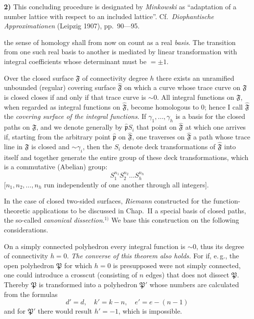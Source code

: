 \documentclass{article}
\begin{document}
\textbf{2)} This concluding procedure is designated by \emph{Minkowski} as ``adaptation of a number lattice with respect to an included lattice''. Cf.\ \emph{Diophantische Approximationen} (Leipzig 1907), pp.~90---95.

the sense of homology shall from now on count as a real \emph{basis}. The transition from one such real basis to another is mediated by linear transformation with integral coefficients whose determinant must be $= \pm 1$.

Over the closed surface $\mathfrak{F}$ of connectivity degree $h$ there exists an unramified unbounded (regular) covering surface $\hat{\mathfrak{F}}$ on which a curve whose trace curve on $\mathfrak{F}$ is closed closes if and only if that trace curve is $\sim 0$. All integral functions on $\mathfrak{F}$, when regarded as integral functions on $\hat{\mathfrak{F}}$, become homologous to $0$; hence I call $\hat{\mathfrak{F}}$ the \emph{covering surface of the integral functions}. If $\gamma_1, \dots, \gamma_h$ is a basis for the closed paths on $\mathfrak{F}$, and we denote generally by $\hat{\mathfrak{p}} S_i$ that point on $\hat{\mathfrak{F}}$ at which one arrives if, starting from the arbitrary point $\hat{\mathfrak{p}}$ on $\hat{\mathfrak{F}}$, one traverses on $\hat{\mathfrak{F}}$ a path whose trace line in $\mathfrak{F}$ is closed and $\sim \gamma_i$, then the $S_i$ denote deck transformations of $\hat{\mathfrak{F}}$ into itself and together generate the entire group of these deck transformations, which is a commutative (Abelian) group:
\[ S_1^{n_1} S_2^{n_2} \dots S_h^{n_h} \]
[$n_1, n_2, \dots, n_h$ run independently of one another through all integers].

In the case of closed two-sided surfaces, \emph{Riemann} constructed for the function-theoretic applications to be discussed in Chap.~II a special basis of closed paths, the so-called \emph{canonical dissection}.${}^{1)}$ We base this construction on the following considerations.

On a simply connected polyhedron every integral function is $\sim 0$, thus its degree of connectivity $h = 0$. \emph{The converse of this theorem also holds.} For if, e.\,g., the open polyhedron $\mathfrak{P}$ for which $h = 0$ is presupposed were not simply connected, one could introduce a crosscut (consisting of $n$ edges) that does not dissect $\mathfrak{P}$. Thereby $\mathfrak{P}$ is transformed into a polyhedron $\mathfrak{P}'$ whose numbers are calculated from the formulas
\[ d' = d, \quad k' = k - n, \quad e' = e - (n - 1) \]
and for $\mathfrak{P}'$ there would result $h' = - 1$, which is impossible.
\end{document}
